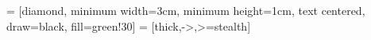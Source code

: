  = [diamond, 
minimum width=3cm, 
minimum height=1cm, 
text centered, 
draw=black, 
fill=green!30]
 = [thick,->,>=stealth]

\setcounter{tocdepth}{6}

\makeglossaries

\newcommand{\keywords}[1]{\textit{Keywords}: #1}

\usepackage{letltxmacro}
\makeatletter
\let\oldr@@t\r@@t
\def\r@@t#1#2{%
	\setbox0=\hbox{$\oldr@@t#1{#2\,}$}\dimen0=\ht0
	\advance\dimen0-0.2\ht0
	\setbox2=\hbox{\vrule height\ht0 depth -\dimen0}%
	{\box0\lower0.4pt\box2}}
\LetLtxMacro{\oldsqrt}{\sqrt}
\renewcommand*{\sqrt}[2][\ ]{\oldsqrt[#1]{#2}}